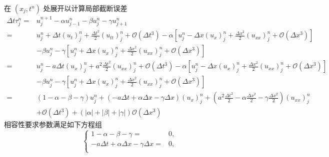 \begin{solution*}
    在 $(x_j,t^n)$ 处展开以计算局部截断误差
    \begin{align*}
        \Delta t \tau_j^n ={} & u_j^{n+1} - \alpha u_{j-1}^n - \beta u_j^n - \gamma u_{j+1}^n                                \\
        ={}                   & u_j^n + \Delta t (u_t)_j^n + \frac{\Delta t^2}2 (u_{tt})_j^n + \mathcal{O}(\Delta t^3)
        - \alpha \left[
            u_j^n - \Delta x (u_x)_j^n + \frac{\Delta x^2}2 (u_{xx})_j^n + \mathcal{O}(\Delta x^3)
        \right]                                                                                                              \\
                              & - \beta u_j^n
        - \gamma \left[
            u_j^n + \Delta x (u_x)_j^n + \frac{\Delta x^2}2 (u_{xx})_j^n + \mathcal{O}(\Delta x^3)
        \right]                                                                                                              \\
        ={}                   & u_j^n - a \Delta t (u_x)_j^n + a^2 \frac{\Delta t^2}2 (u_{xx})_j^n + \mathcal{O}(\Delta t^3)
        - \alpha \left[
            u_j^n - \Delta x (u_x)_j^n + \frac{\Delta x^2}2 (u_{xx})_j^n + \mathcal{O}(\Delta x^3)
        \right]                                                                                                              \\
                              & - \beta u_j^n
        - \gamma \left[
            u_j^n + \Delta x (u_x)_j^n + \frac{\Delta x^2}2 (u_{xx})_j^n + \mathcal{O}(\Delta x^3)
        \right]                                                                                                              \\
        ={}                   & (1-\alpha - \beta - \gamma) u_j^n +
        (- a \Delta t + \alpha \Delta x - \gamma \Delta x) (u_x)_j^n
        + \left(a^2 \frac{\Delta t^2}2 - \alpha \frac{\Delta x^2}2 - \gamma \frac{\Delta x^2}2\right) (u_{xx})_j^n           \\
                              & + \mathcal{O}(\Delta t^3) + (|\alpha| + |\beta| + |\gamma|) \mathcal{O}(\Delta x^3)
    \end{align*}
    相容性要求参数满足如下方程组
    \[
        \left\{
        \begin{aligned}
            1-\alpha - \beta - \gamma ={}                                                      & 0, \\
            - a \Delta t + \alpha \Delta x - \gamma \Delta x ={}                               & 0, \\

\end{aligned}\]
\end{solution*}
